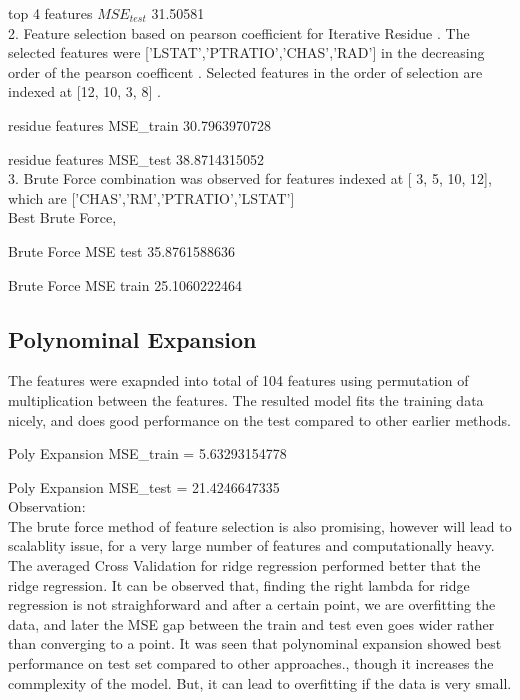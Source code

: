 \documentclass[10pt,letterpaper]{article}
\begin{document}
	top 4 features $MSE_{test}$   31.50581\\

2. Feature selection based on pearson coefficient for Iterative Residue . The selected features were ['LSTAT','PTRATIO','CHAS','RAD'] in the decreasing order of the pearson coefficent .
Selected features in the order of selection are indexed at [12, 10, 3, 8] .

	residue features MSE\_train 30.7963970728

	residue features MSE\_test 38.8714315052\\

3. Brute Force combination was observed for features indexed at [ 3, 5, 10, 12], which are ['CHAS','RM','PTRATIO','LSTAT'] \\
Best Brute Force, 

	Brute Force MSE test 35.8761588636  

	Brute Force MSE train 25.1060222464
\subsection{Polynominal Expansion }

The features were exapnded into total of 104 features using permutation of multiplication between the features. The resulted model fits the training data nicely, and does good performance on the test compared to other earlier methods.

	Poly Expansion MSE\_train = 5.63293154778

	Poly Expansion MSE\_test =  21.4246647335\\

Observation:\\
 The brute force method of feature selection is also promising, however will lead to scalablity issue, for a very large number of features and computationally heavy. The averaged Cross Validation for ridge regression performed better that the ridge regression. It can be observed that, finding the right lambda for ridge regression is not straighforward and after a certain point, we are overfitting the data, and later the MSE gap between the train and test even goes wider rather than converging to a point.
It was seen that polynominal expansion showed best performance on test set compared to other approaches., though it increases the commplexity of the model. But, it can lead to overfitting if the data is very small.
 




 
\end{document}
